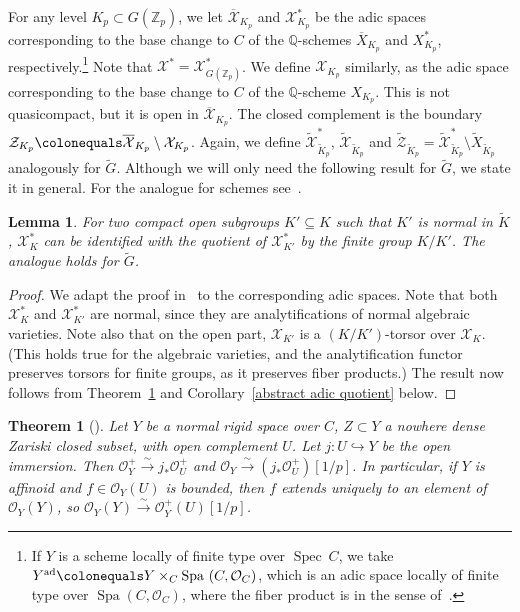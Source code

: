 \documentclass{amsart}
\newtheorem{thm}[subsubsection]{Theorem}
\newtheorem{lemma}[subsubsection]{Lemma}
\theoremstyle{remark}
\numberwithin{equation}{subsection}
\newcommand{\Q}{\QQ}
\newcommand{\Z}{\ZZ}
\newcommand{\QQ}{{\mathbb Q}}
\newcommand{\ZZ}{{\mathbb Z}}
\newcommand{\cO}{{\mathcal O}}
\newcommand{\cX}{{\mathcal X}}
\newcommand{\cZ}{{\mathcal Z}}
\newcommand{\Zp}{\Z_p}
\DeclareMathOperator{\Spa}{Spa}
\DeclareMathOperator{\Spec}{Spec}
\newcommand{\toisom}{\xrightarrow{\sim}}
\newcommand{\tG}{\widetilde{G}}
\newcommand{\tK}{{\widetilde{K}}}
\newcommand{\ol}{\overline}
\newcommand{\wt}{\widetilde}
\newcommand{\sub}{\subseteq}
\newcommand{\defeq}{\colonequals}
\renewcommand{\(}{\left(}
\renewcommand{\)}{\right)}
\begin{document}
\medskip

For any level $K_p\subset G(\Zp)$, we let $\ol{\cX}_{K_p}$ and $\cX^\ast_{K_p}$ be the adic spaces corresponding to the base change to $C$ of the $\Q$-schemes $\ol{X}_{K_p}$ and $X^\ast_{K_p}$, respectively.\footnote{If $Y$ is a scheme locally of finite type over $\Spec\ C$, we take $Y^{\mathrm{ad}}\defeq Y\times_{C}\Spa\ (C, \cO_C)$, which is an adic space locally of finite type over $\Spa (C, \cO_C)$, where the fiber product is in the sense of~\cite[Prop.~3.8]{huber-adic-spaces}.} Note that $\cX^\ast = \cX^\ast_{G(\Zp)}$. We define $\cX_{K_p}$ similarly, as the adic space corresponding to the base change to $C$ of the $\Q$-scheme $X_{K_p}$. This is not quasicompact, but it is open in $\ol{\cX}_{K_p}$. The closed complement is the boundary $\cZ_{K_p}\defeq \ol{\cX}_{K_p} \setminus \cX_{K_p}$. Again, we define $\wt{\cX}^\ast_{\tK_p}$, $\wt{\cX}_{\tK_p}$ and $\wt{\cZ}_{\tK_p} = \wt{\cX}^\ast_{\tK_p} \setminus \wt{X}_{\tK_p}$ analogously for $\tG$. Although we will only need the following result for $\tG$, we state it in general. For the analogue for schemes see~\cite[Cor. 7.2.5.2]{lan-thesis}.

\begin{lemma}\label{adic quotient} For two compact open subgroups $K' \sub K$ such that $K'$ is normal in $\tK$, $\cX^\ast_{K}$ can be identified with the quotient of $\cX^\ast_{K'}$ by the finite group $K/K'$. The analogue holds for $\tG$.
\end{lemma}

\begin{proof}

We adapt 
the proof in~\cite[Cor. 7.2.5.2]{lan-thesis} to the corresponding adic spaces. Note that both $\cX^*_{K}$ and $\cX^*_{K'}$ are normal, since they are analytifications of normal algebraic varieties. Note also that on the open part, $\cX_{K'}$ is a $(K/K')$-torsor over $\cX_K$. (This holds true for the algebraic varieties, and the analytification functor preserves torsors for finite groups, as it preserves fiber products.) The result now follows from Theorem~\ref{bartenwerfer} and Corollary~\ref{abstract adic quotient} below. 
\end{proof}

\begin{thm}[{\cite[\S3]{bartenwerfer}}]\label{bartenwerfer} Let $Y$ be a normal rigid space over $C$, $Z\subset Y$ a
nowhere dense Zariski closed subset, with open complement $U$. 
Let $j\colon U\hookrightarrow Y$ be the open immersion.
Then $\cO^+_{Y} \toisom j_*\cO^+_{U}$ and $\cO_{Y} \toisom (j_*\cO^+_{U})[1/p]$. In particular, if $Y$ is affinoid and $f\in \cO_Y(U)$ is bounded, then $f$ extends uniquely to an element of 
$\cO_Y(Y)$, so $\cO_Y(Y)\toisom \cO^+_Y(U)[1/p]$. 
\end{thm}
\end{document}
